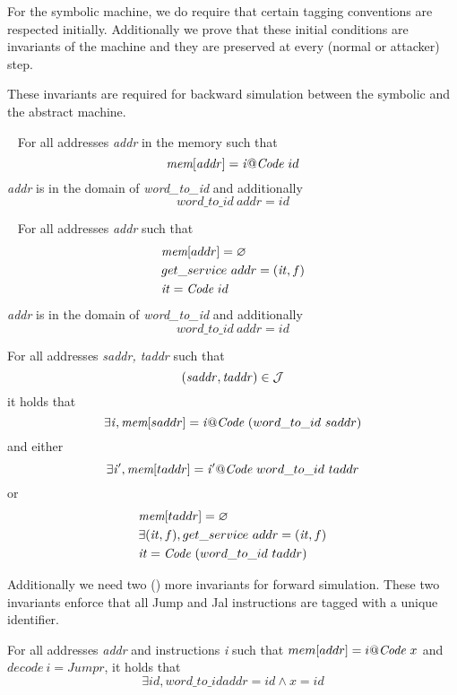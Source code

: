 For the symbolic machine, we do require that certain tagging
conventions are respected initially. Additionally we prove that
these initial conditions are invariants of the machine and they
are preserved at every (normal or attacker) step.

These invariants are required for backward simulation between
the symbolic and the abstract machine.

\begin{definition}\label{instructions_tagged}
  ~ For all addresses \textit{addr} in the memory such that
  $$\textit{mem}[\mathit{addr}] = \mathit{i}@\textit{Code}~id$$ \textit{addr}
  is in the domain of \emph{word\_to\_id} and additionally
  $$word\_to\_id ~\mathit{addr} = \mathit{id}$$
\end{definition}

\begin{definition}\label{entry_tagged}
  ~ For all addresses \textit{addr} such that
  \begin{align*}
  & \textit{mem}[addr] = \varnothing\\
  & get\_service~addr = (\mathit{it},f)\\
  & \mathit{it} = \textit{Code}~id
  \end{align*}
  \textit{addr} is in the domain of \emph{word\_to\_id} and additionally
  $$word\_to\_id ~\mathit{addr} = \mathit{id}$$
\end{definition}

\begin{definition}\label{valid_jmp_tagged}
  For all addresses \textit{saddr, taddr} such that
  $$(\mathit{saddr},\mathit{taddr}) \in \mathcal{J}$$ it holds that
  $$\exists \mathit{i}, \textit{mem}[saddr] = \mathit{i}@\textit{Code}~(word\_to\_id~saddr) $$
  and either $$\exists \mathit{i'}, \textit{mem}[taddr]
  =\mathit{i'}@\textit{Code}~word\_to\_id~taddr$$ or
  \begin{align*}
  & \textit{mem}[taddr] = \varnothing\\
  & \exists (\mathit{it},f), get\_service~addr = (\mathit{it},f)\\
  & \mathit{it} = \textit{Code}~(word\_to\_id~taddr)
  \end{align*}
\end{definition}

Additionally we need two () more invariants for forward
simulation. These two invariants enforce that all Jump and Jal instructions
are tagged with a unique identifier.

\begin{definition}\label{jumps_tagged}
  For all addresses \textit{addr} and instructions \textit{i} such
  that $mem[addr]=i@\textit{Code}~x$ and $decode~i = Jump r$, it holds that
  $$\exists id, word\_to\_id addr = id \land x = id$$
\end{definition}

